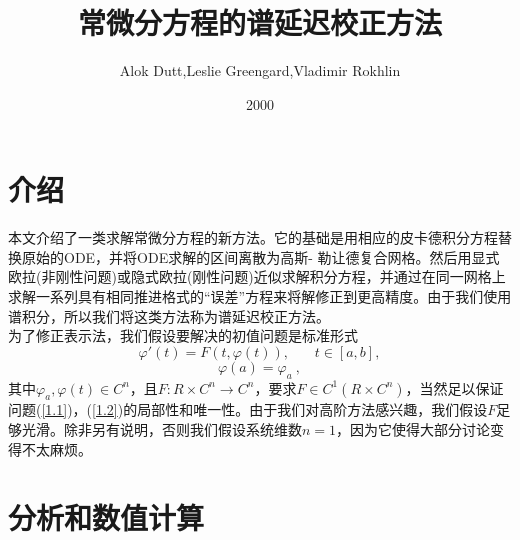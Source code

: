 \documentclass[12pt,a4paper]{article}
\title{常微分方程的谱延迟校正方法}
\author{Alok Dutt,Leslie Greengard,Vladimir Rokhlin}
\date{2000}
\begin{document}
\maketitle
\section{介绍}

本文介绍了一类求解常微分方程的新方法。它的基础是用相应的皮卡德积分方程替换原始的ODE，并将ODE求解的区间离散为高斯- 勒让德复合网格。然后用显式欧拉(非刚性问题)或隐式欧拉(刚性问题)近似求解积分方程，并通过在同一网格上求解一系列具有相同推进格式的“误差”方程来将解修正到更高精度。由于我们使用谱积分，所以我们将这类方法称为谱延迟校正方法。\\

为了修正表示法，我们假设要解决的初值问题是标准形式\\
\begin{equation}
\label{1.1}
\varphi '(t) = F(t,\varphi (t)),~~~~~~~~t \in [a,b],
\end{equation}
\begin{equation}
\label{1.2}
\varphi(a) = \varphi_{a}~,
\end{equation}
其中$\varphi_{a},\varphi(t) \in C^n$，且$F:R \times C^n \rightarrow C^n$，要求$F \in C^1(R \times C^n)$，当然足以保证问题(\ref{1.1})，(\ref{1.2})的局部性和唯一性。由于我们对高阶方法感兴趣，我们假设$F$足够光滑。除非另有说明，否则我们假设系统维数$n=1$，因为它使得大部分讨论变得不太麻烦。\\

\section{分析和数值计算}
\end{document}
